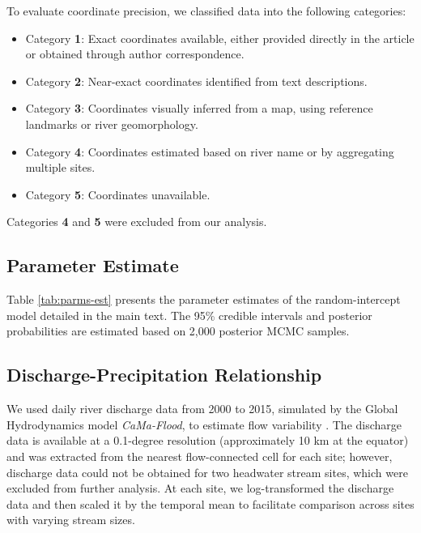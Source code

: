 \documentclass[11pt, class=article, crop=false]{standalone}
\theoremstyle{definition}
\begin{document}
To evaluate coordinate precision, we classified data into the following categories:

\begin{itemize}
    \item Category \textbf{1}: Exact coordinates available, either provided directly in the article or obtained through author correspondence.
    \item Category \textbf{2}: Near-exact coordinates identified from text descriptions.
    \item Category \textbf{3}: Coordinates visually inferred from a map, using reference landmarks or river geomorphology.
    \item Category \textbf{4}: Coordinates estimated based on river name or by aggregating multiple sites.
    \item Category \textbf{5}: Coordinates unavailable.
\end{itemize}

Categories \textbf{4} and \textbf{5} were excluded from our analysis.



\subsection{Parameter Estimate}

Table \ref{tab:parms-est} presents the parameter estimates of the random-intercept model detailed in the main text.
The 95\% credible intervals and posterior probabilities are estimated based on 2,000 posterior MCMC samples.



\subsection{Discharge-Precipitation Relationship}
We used daily river discharge data from 2000 to 2015, simulated by the Global Hydrodynamics model \textit{CaMa-Flood}, to estimate flow variability  \citep{yamazaki_deriving_2009, kimura_methodology_2023, lin_global_2019}.
The discharge data is available at a 0.1-degree resolution (approximately 10 km at the equator) and was extracted from the nearest flow-connected cell for each site; however, discharge data could not be obtained for two headwater stream sites, which were excluded from further analysis.
At each site, we log-transformed the discharge data and then scaled it by the temporal mean to facilitate comparison across sites with varying stream sizes.
\end{document}

